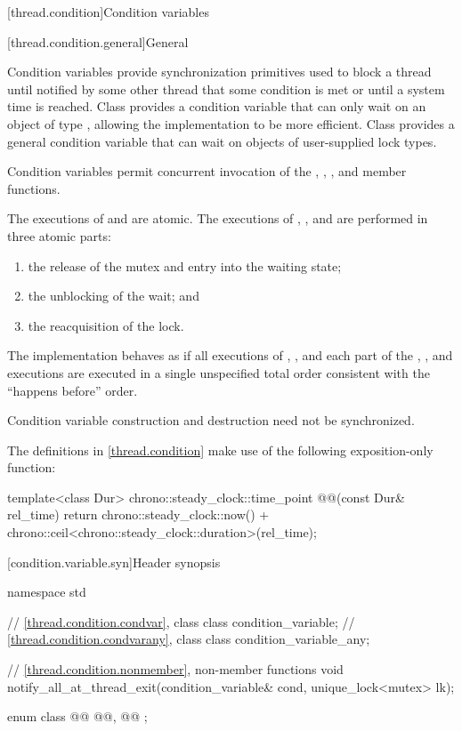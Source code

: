 [thread.condition]{Condition variables}

[thread.condition.general]{General}

\pnum
Condition variables provide synchronization primitives used to block a thread until
notified by some other thread that some condition is met or until a system time is
reached. Class  provides a condition variable that can only
wait on an object of type , allowing the implementation
to be more efficient. Class  provides a general
condition variable that can wait on objects of user-supplied lock types.

\pnum
Condition variables permit concurrent invocation of the , ,
,  and  member functions.

\pnum
The executions of  and 
are atomic.
The executions of , , and  are performed
in three atomic parts:
\begin{enumerate}
\item the release of the mutex and entry into the waiting state;
\item the unblocking of the wait; and
\item the reacquisition of the lock.
\end{enumerate}

\pnum
The implementation behaves as if all executions of , , and each
part of the , , and  executions are
executed in a single unspecified total order consistent with the ``happens before'' order.

\pnum
Condition variable construction and destruction need not be synchronized.

\pnum
The definitions in \ref{thread.condition}
make use of the following exposition-only function:
\begin{codeblock}
template<class Dur>
  chrono::steady_clock::time_point @@(const Dur& rel_time)
  { return chrono::steady_clock::now() +
           chrono::ceil<chrono::steady_clock::duration>(rel_time); }
\end{codeblock}

[condition.variable.syn]{Header  synopsis}

%
\begin{codeblock}
namespace std {
  // \ref{thread.condition.condvar}, class 
  class condition_variable;
  // \ref{thread.condition.condvarany}, class 
  class condition_variable_any;

  // \ref{thread.condition.nonmember}, non-member functions
  void notify_all_at_thread_exit(condition_variable& cond, unique_lock<mutex> lk);

  enum class @@ { @@, @@ };
}
\end{codeblock}

